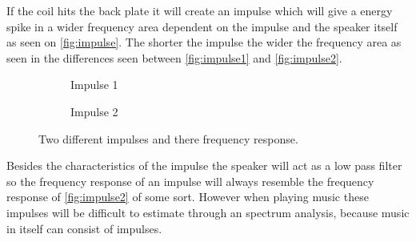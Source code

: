 % 


If the coil hits the back plate it will create an impulse which will give a energy spike in a wider frequency area dependent on the impulse and the speaker itself as seen on \autoref{fig:impulse}. The shorter the impulse the wider the frequency area as seen in the differences seen between \autoref{fig:impulse1} and \autoref{fig:impulse2}.  

\begin{figure}[H]
\begin{subfigure}[t]{0.47\textwidth}
\centering
{}
\scalebox{0.6}{
}
\caption{Impulse 1}
\label{fig:impulse1}
\end{subfigure}
\hspace{6mm} 
\begin{subfigure}[t]{0.47\textwidth}
\centering
{}
\scalebox{0.6}{
}
\caption{Impulse 2}
\label{fig:impulse2}
\end{subfigure}
\caption{Two different impulses and there frequency response.}
\label{fig:impulse}
\end{figure}
Besides the characteristics of the impulse the speaker will act as a low pass filter so the frequency response of an impulse will always resemble the frequency response of \autoref{fig:impulse2} of some sort. However when playing music these impulses will be difficult to estimate through an spectrum analysis, because music in itself can consist of impulses.     


